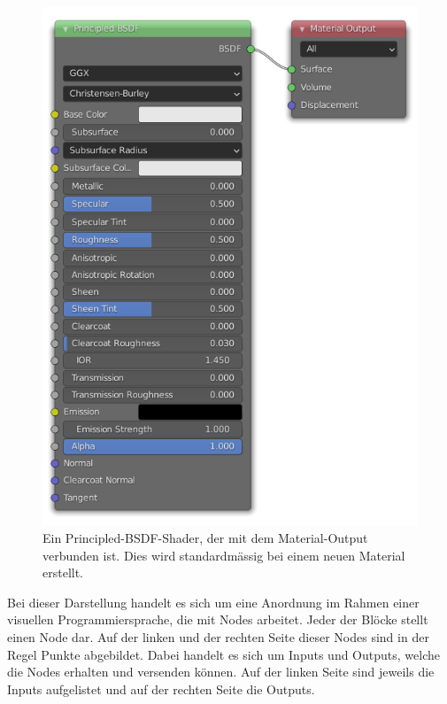 \documentclass[
]{book}
\let\oldmarginnote\marginnote
\renewcommand{\marginnote}[1]{%
  \oldmarginnote{{\footnotesize\selectfont #1}}%
}
\begin{document}
\begin{figure}

\includegraphics{Chapters/Images/Chapter_18/18_1_Default_Material.png}

\caption{\label{fig-1_1}Ein Principled-BSDF-Shader, der mit dem
Material-Output verbunden ist. Dies wird standardmässig bei einem neuen
Material erstellt.}

\end{figure}%

\marginnote{Nodes}

Bei dieser Darstellung handelt es sich um eine Anordnung im Rahmen einer
visuellen Programmiersprache, die mit Nodes arbeitet. Jeder der Blöcke
stellt einen Node dar. Auf der linken und der rechten Seite dieser Nodes
sind in der Regel Punkte abgebildet. Dabei handelt es sich um Inputs und
Outputs, welche die Nodes erhalten und versenden können. Auf der linken
Seite sind jeweils die Inputs aufgelistet und auf der rechten Seite die
Outputs.
\end{document}
